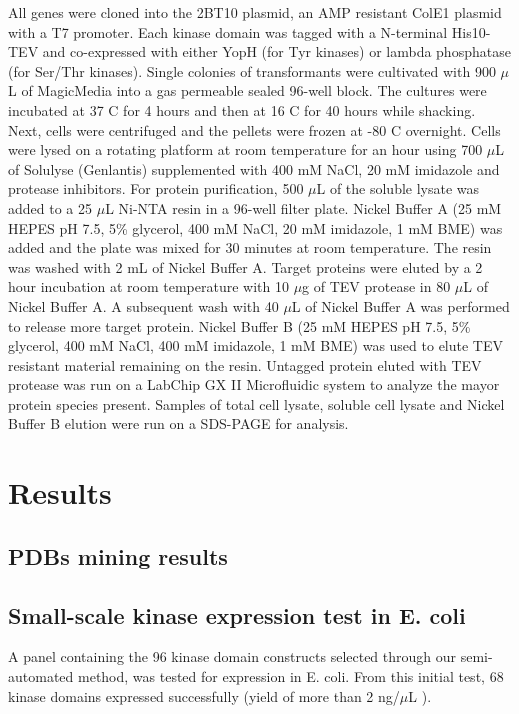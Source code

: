 \documentclass[aps,pre,twocolumn,nofootinbib,superscriptaddress,linenumbers]{revtex4-1}
\begin{document}
All genes were cloned into the 2BT10 plasmid, an AMP resistant ColE1 plasmid with a T7 promoter.
Each kinase domain was tagged with a N-terminal His10-TEV and co-expressed with either YopH (for Tyr kinases) or lambda phosphatase (for Ser/Thr kinases). 
Single colonies of transformants were cultivated with 900 $\mu$L of MagicMedia into a gas permeable sealed 96-well block. 
The cultures were incubated at 37 C for 4 hours and then at 16 C for 40 hours while shacking. 
Next, cells were centrifuged and the pellets were frozen at -80 C overnight. 
Cells were lysed on a rotating platform at room temperature for an hour using 700 $\mu$L of Solulyse (Genlantis) supplemented with 400 mM NaCl, 20 mM imidazole and protease inhibitors. 
For protein purification, 500 $\mu$L of the soluble lysate was added to a 25 $\mu$L Ni-NTA resin in a 96-well filter plate. 
Nickel Buffer A (25 mM HEPES pH 7.5, 5\% glycerol, 400 mM NaCl, 20 mM imidazole, 1 mM BME) was added and the plate was mixed for 30 minutes at room temperature. 
The resin was washed with 2 mL of Nickel Buffer A. 
Target proteins were eluted by a 2 hour incubation at room temperature with 10 $\mu$g of TEV protease in 80 $\mu$L of Nickel Buffer A.
A subsequent wash with 40 $\mu$L of Nickel Buffer A was performed to release more target protein. 
Nickel Buffer B (25 mM HEPES pH 7.5, 5\% glycerol, 400 mM NaCl, 400 mM imidazole, 1 mM BME) was used to elute TEV resistant material remaining on the resin.
Untagged protein eluted with TEV protease was run on a LabChip GX II Microfluidic system to analyze the mayor protein species present. 
Samples of total cell lysate, soluble cell lysate and Nickel Buffer B elution were run on a SDS-PAGE for analysis. 

\section{Results}
\label{section:results}

\subsection{PDBs mining results}

\subsection{Small-scale kinase expression test in E. coli}

A panel containing the 96 kinase domain constructs selected through our semi-automated method, was tested for expression in E. coli. 
From this initial test, 68 kinase domains expressed successfully (yield of more than 2 ng/$\mu$L ). 


%  
% 
\end{document}

